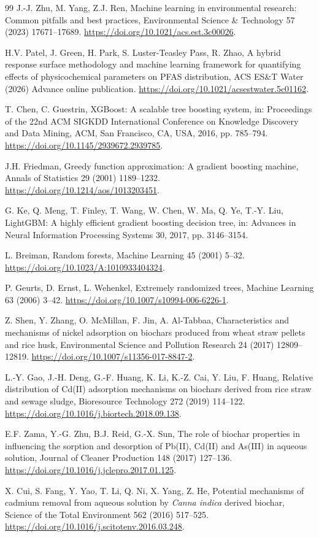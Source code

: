 \documentclass[review,12pt,number]{elsarticle}
\begin{document}
\begin{thebibliography}{99}
J.-J. Zhu, M. Yang, Z.J. Ren, Machine learning in environmental research: Common pitfalls and best practices, Environmental Science \& Technology 57 (2023) 17671--17689. \url{https://doi.org/10.1021/acs.est.3c00026}.

H.V. Patel, J. Green, H. Park, S. Luster-Teasley Pass, R. Zhao, A hybrid response surface methodology and machine learning framework for quantifying effects of physicochemical parameters on PFAS distribution, ACS ES\&T Water (2026) Advance online publication. \url{https://doi.org/10.1021/acsestwater.5c01162}.

T. Chen, C. Guestrin, XGBoost: A scalable tree boosting system, in: Proceedings of the 22nd ACM SIGKDD International Conference on Knowledge Discovery and Data Mining, ACM, San Francisco, CA, USA, 2016, pp. 785--794. \url{https://doi.org/10.1145/2939672.2939785}.

J.H. Friedman, Greedy function approximation: A gradient boosting machine, Annals of Statistics 29 (2001) 1189--1232. \url{https://doi.org/10.1214/aos/1013203451}.

G. Ke, Q. Meng, T. Finley, T. Wang, W. Chen, W. Ma, Q. Ye, T.-Y. Liu, LightGBM: A highly efficient gradient boosting decision tree, in: Advances in Neural Information Processing Systems 30, 2017, pp. 3146--3154.

L. Breiman, Random forests, Machine Learning 45 (2001) 5--32. \url{https://doi.org/10.1023/A:1010933404324}.

P. Geurts, D. Ernst, L. Wehenkel, Extremely randomized trees, Machine Learning 63 (2006) 3--42. \url{https://doi.org/10.1007/s10994-006-6226-1}.

Z. Shen, Y. Zhang, O. McMillan, F. Jin, A. Al-Tabbaa, Characteristics and mechanisms of nickel adsorption on biochars produced from wheat straw pellets and rice husk, Environmental Science and Pollution Research 24 (2017) 12809--12819. \url{https://doi.org/10.1007/s11356-017-8847-2}.

L.-Y. Gao, J.-H. Deng, G.-F. Huang, K. Li, K.-Z. Cai, Y. Liu, F. Huang, Relative distribution of Cd(II) adsorption mechanisms on biochars derived from rice straw and sewage sludge, Bioresource Technology 272 (2019) 114--122. \url{https://doi.org/10.1016/j.biortech.2018.09.138}.

E.F. Zama, Y.-G. Zhu, B.J. Reid, G.-X. Sun, The role of biochar properties in influencing the sorption and desorption of Pb(II), Cd(II) and As(III) in aqueous solution, Journal of Cleaner Production 148 (2017) 127--136. \url{https://doi.org/10.1016/j.jclepro.2017.01.125}.

X. Cui, S. Fang, Y. Yao, T. Li, Q. Ni, X. Yang, Z. He, Potential mechanisms of cadmium removal from aqueous solution by \textit{Canna indica} derived biochar, Science of the Total Environment 562 (2016) 517--525. \url{https://doi.org/10.1016/j.scitotenv.2016.03.248}.

\end{thebibliography}
\end{document}
